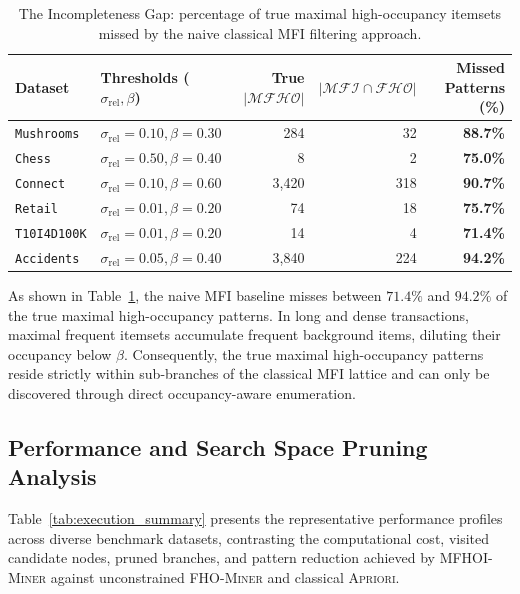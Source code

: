 \documentclass[runningheads,orivec]{llncs}
\newcommand{\FHO}{\ensuremath{\mathcal{FHO}}}
\newcommand{\MFI}{\ensuremath{\mathcal{MFI}}}
\newcommand{\MFHOI}{\ensuremath{\mathcal{MFHO}}}
\newcommand{\MFHOIMiner}{\textsc{MFHOI-Miner}}
\begin{document}
\begin{table}[htbp]
\centering
\caption{The Incompleteness Gap: percentage of true maximal high-occupancy itemsets missed by the naive classical MFI filtering approach.}
\label{tab:incompleteness}
\begin{tabular}{ll rrr}
\toprule
\textbf{Dataset} & \textbf{Thresholds ($\sigma_{\mathrm{rel}}, \beta$)} & \textbf{True $|\MFHOI|$} & \textbf{$|\MFI \cap \FHO|$} & \textbf{Missed Patterns (\%)} \\
\midrule
\texttt{Mushrooms} & $\sigma_{\mathrm{rel}}=0.10, \beta=0.30$ & 284 & 32 & \textbf{88.7\%} \\
\texttt{Chess}     & $\sigma_{\mathrm{rel}}=0.50, \beta=0.40$ & 8   & 2  & \textbf{75.0\%} \\
\texttt{Connect}   & $\sigma_{\mathrm{rel}}=0.10, \beta=0.60$ & 3,420 & 318 & \textbf{90.7\%} \\
\texttt{Retail}    & $\sigma_{\mathrm{rel}}=0.01, \beta=0.20$ & 74  & 18 & \textbf{75.7\%} \\
\texttt{T10I4D100K}& $\sigma_{\mathrm{rel}}=0.01, \beta=0.20$ & 14  & 4  & \textbf{71.4\%} \\
\texttt{Accidents} & $\sigma_{\mathrm{rel}}=0.05, \beta=0.40$ & 3,840 & 224 & \textbf{94.2\%} \\
\bottomrule
\end{tabular}
\end{table}

As shown in Table~\ref{tab:incompleteness}, the naive MFI baseline misses between $71.4\%$ and $94.2\%$ of the true maximal high-occupancy patterns. In long and dense transactions, maximal frequent itemsets accumulate frequent background items, diluting their occupancy below $\beta$. Consequently, the true maximal high-occupancy patterns reside strictly within sub-branches of the classical MFI lattice and can only be discovered through direct occupancy-aware enumeration.

\subsection{Performance and Search Space Pruning Analysis}

Table~\ref{tab:execution_summary} presents the representative performance profiles across diverse benchmark datasets, contrasting the computational cost, visited candidate nodes, pruned branches, and pattern reduction achieved by \MFHOIMiner{} against unconstrained \textsc{FHO-Miner} and classical \textsc{Apriori}.
\end{document}
